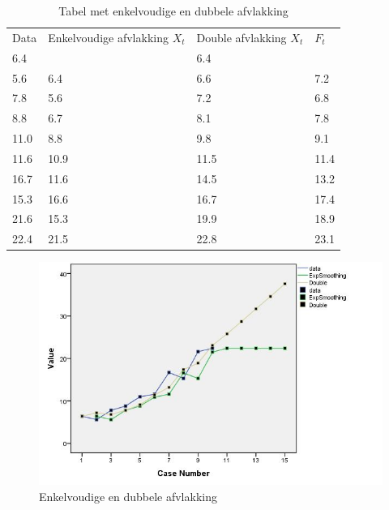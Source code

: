 \begin{table}
  \centering
  \begin{tabular}{|llll|}
    \hline
    Data & Enkelvoudige afvlakking $X_{t}$ & Double afvlakking $X_{t}$ & $F_{t}$ \\
    6.4  & ~                      & 6.4              & ~                             \\
    5.6  & 6.4                    & 6.6              & 7.2                           \\
    7.8  & 5.6                    & 7.2              & 6.8                           \\
    8.8  & 6.7                    & 8.1              & 7.8                           \\
    11.0 & 8.8                    & 9.8              & 9.1                           \\
    11.6 & 10.9                   & 11.5             & 11.4                          \\
    16.7 & 11.6                   & 14.5             & 13.2                          \\
    15.3 & 16.6                   & 16.7             & 17.4                          \\
    21.6 & 15.3                   & 19.9             & 18.9                          \\
    22.4 & 21.5                   & 22.8             & 23.1                          \\ \hline
  \end{tabular}
  \caption{Tabel met enkelvoudige en dubbele afvlakking}
  \label{tab:doubleSingle}
\end{table}

\begin{figure}
	\centering
		\includegraphics[width=1.00\textwidth]{images/tijdreeksen/tijdreeks71.jpg}
	\caption{Enkelvoudige en dubbele afvlakking}
	\label{fig:tijdreeks71}
\end{figure}

